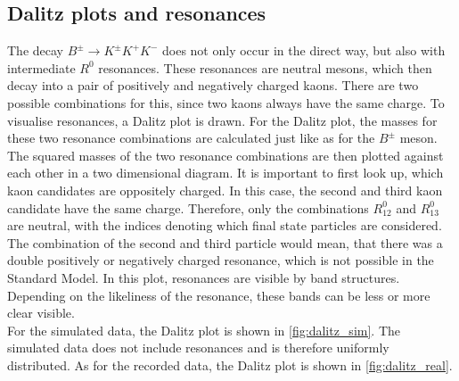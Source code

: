 \subsection{Dalitz plots and resonances}

The decay $B^{\pm} \rightarrow K^{\pm} K^+ K^-$ does not only occur in the direct way, but also with intermediate $R^0$ resonances. These resonances are neutral mesons, which then decay into a pair of positively and negatively
charged kaons. There are two possible combinations for this, since two kaons always have the same charge. To visualise resonances, a Dalitz plot is drawn. For the Dalitz plot, the masses for these two resonance combinations
are calculated just like as for the $B^{\pm}$ meson. The squared masses of the two resonance combinations are then plotted against each other in a two dimensional diagram. It is important to first look up, which kaon candidates are oppositely charged. In this case, the second and third kaon candidate have the same charge. 
Therefore, only the combinations $R_{12}^0$ and $R_{13}^0$ are neutral, with the indices denoting which final state particles are considered. The combination of the second and third particle would mean, that there was a double positively or negatively charged resonance, which is not possible in the Standard Model.
In this plot, resonances are visible by band structures. Depending
on the likeliness of the resonance, these bands can be less or more clear visible.\\
For the simulated data, the Dalitz plot is shown in \autoref{fig:dalitz_sim}. The simulated data does not include resonances and is therefore uniformly distributed.
As for the recorded data, the Dalitz plot is shown in \autoref{fig:dalitz_real}. 
